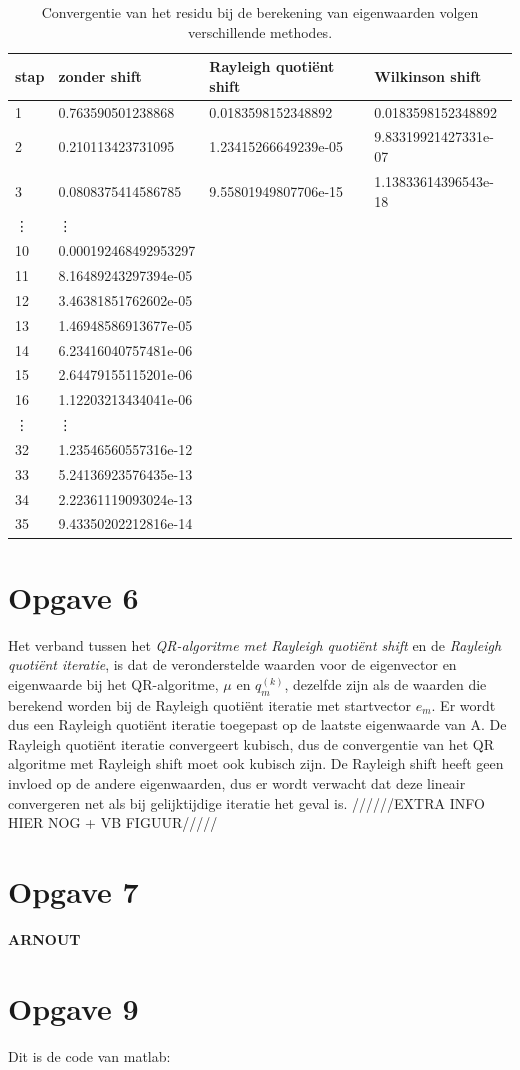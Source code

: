 \documentclass[a4paper]{article}
\newcommand{\opgave}[1]{\section*{Opgave #1}}
\begin{document}
\begin{table}[h]
\begin{tabular}{|l|l|l|l|}
\hline
stap & zonder shift & Rayleigh quoti\"{e}nt shift & Wilkinson shift \\
\hline
1 & 0.763590501238868 & 0.0183598152348892 & 0.0183598152348892 \\
2 & 0.210113423731095 & 1.23415266649239e-05 & 9.83319921427331e-07 \\
3 & 0.0808375414586785 & 9.55801949807706e-15 & 1.13833614396543e-18 \\
\vdots & \vdots &  &  \\
10 & 0.000192468492953297 &  &  \\
11 & 8.16489243297394e-05 &  &  \\
12 & 3.46381851762602e-05 &  &  \\
13 & 1.46948586913677e-05 &  &  \\
14 & 6.23416040757481e-06 &  &  \\
15 & 2.64479155115201e-06 &  &  \\
16 & 1.12203213434041e-06 &  &  \\
\vdots & \vdots &  &  \\
32 & 1.23546560557316e-12 &  &  \\
33 & 5.24136923576435e-13 &  &  \\
34 & 2.22361119093024e-13 &  &  \\
35 & 9.43350202212816e-14 &  &  \\
\hline
\end{tabular}
\caption{Convergentie van het residu bij de berekening van eigenwaarden volgen verschillende methodes.}
\label{table:tab2}
\end{table}
\opgave{6}
Het verband tussen het \textit{QR-algoritme met Rayleigh quoti\"{e}nt shift} en de \textit{Rayleigh quoti\"{e}nt iteratie}, is dat de veronderstelde waarden voor de eigenvector
en eigenwaarde bij het QR-algoritme, $\mu$ en $q_m^{(k)}$, dezelfde zijn als de waarden
die berekend worden bij de Rayleigh quoti\"{e}nt iteratie met startvector $e_m$. Er wordt dus een Rayleigh quoti\"{e}nt iteratie toegepast op de laatste eigenwaarde van
A. De Rayleigh quoti\"{e}nt iteratie convergeert kubisch, dus de convergentie van het QR algoritme met Rayleigh shift moet ook kubisch zijn. De Rayleigh shift heeft geen invloed op de andere eigenwaarden, dus er wordt verwacht dat deze lineair convergeren net als bij gelijktijdige iteratie het geval is.
//////EXTRA INFO HIER NOG + VB FIGUUR/////
\opgave{7}
\textbf{ARNOUT}

\opgave{9}
Dit is de code van matlab:

\end{document}
